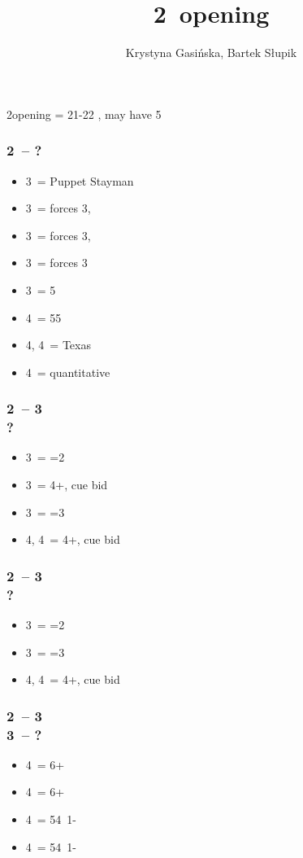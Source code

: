 \documentclass[12pt, a4paper]{article}
\title{2\ntx\ opening}
\author{Krystyna Gasińska, Bartek Słupik}
\begin{document}
\maketitle


2\nt\alrts opening = 21-22 \bal, may have 5\majs

\subsubsection*{2\ntx\ -- ?}
\begin{itemize}
    \item 3\clubs\ = Puppet Stayman
    \item 3\diams\ = forces 3\hearts, \gf
    \item 3\hearts\ = forces 3\spades, \gf
    \item 3\spades\ = forces 3\nt
    \item 3\nt\ = 5\hearts
    \item 4\clubs\ = 55 \majs
    \item 4\diams, 4\hearts\ = Texas
    \item 4\nt\ = quantitative
\end{itemize}

\subsubsection*{2\ntx\ -- 3\diams \\ ?}
\begin{itemize}
    \item 3\hearts\ = =2\hearts
    \item 3\spades\ = 4+\hearts, cue bid
    \item 3\nt\ = =3\spades
    \item 4\clubs, 4\diams\ = 4+\hearts, cue bid
\end{itemize}

\subsubsection*{2\ntx\ -- 3\hearts \\ ?}
\begin{itemize}
    \item 3\spades\ = =2\spades
    \item 3\nt\ = =3\spades
    \item 4\clubs, 4\diams\ = 4+\spades, cue bid
\end{itemize}

\subsubsection*{2\ntx\ -- 3\spades \\ 3\nt\ -- ?}
\begin{itemize}
    \item 4\clubs\ = 6+\clubs
    \item 4\diams\ = 6+\diams
    \item 4\hearts\ = 54\minor\ 1-\hearts
    \item 4\spades\ = 54\minor\ 1-\spades
\end{itemize}

\end{document}
